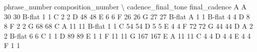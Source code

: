 \documentclass[letterpaper,10pt,english]{sphinxmanual}
\begin{document}
{
\begin{sphinxVerbatim}[commandchars=\\\{\}]
\llap{\color{nbsphinxout}[26]:\,\hspace{\fboxrule}\hspace{\fboxsep}}                                  phrase\_number  composition\_number  \textbackslash{}
cadence\_final\_tone final\_cadence
A                  A                         30                  30
                   B-flat                     1                   1
                   C                          2                   2
                   D                         48                  48
                   E                          6                   6
                   F                         26                  26
                   G                         27                  27
B-flat             A                          1                   1
                   B-flat                     4                   4
                   D                          8                   8
                   F                          2                   2
                   G                         68                  68
C                  A                         11                  11
                   B-flat                     1                   1
                   C                         54                  54
                   D                          5                   5
                   E                          4                   4
                   F                         72                  72
                   G                         44                  44
D                  A                          2                   2
                   B-flat                     6                   6
                   C                          1                   1
                   D                         89                  89
                   E                          1                   1
                   F                         11                  11
                   G                        167                 167
E                  A                         11                  11
                   C                          4                   4
                   D                          4                   4
                   E                          4                   4
                   F                          1                   1

\end{sphinxVerbatim}}
\end{document}
